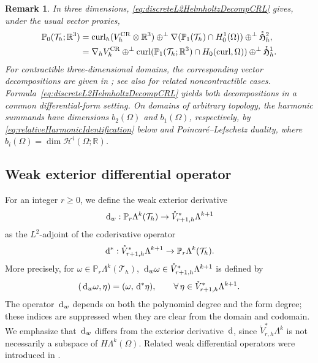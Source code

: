 \documentclass[10pt]{amsart}
\numberwithin{equation}{section}
\newtheorem{remark}[theorem]{Remark}
\newcommand{\dd}{\,{\rm d}}
\newcommand{\curl}{\operatorname{curl}}
\begin{document}
\begin{remark}\rm
In three dimensions, \eqref{eq:discreteL2HelmholtzDecompCRL} gives, under the usual vector proxies,
\begin{align*}
\mathbb P_0(\mathcal T_h;\mathbb R^3)
&=\curl_h(V_h^{\rm CR}\otimes\mathbb R^3)
\oplus^\perp\nabla(\mathbb P_1(\mathcal T_h)\cap H_0^1(\Omega))
\oplus^\perp\mathring{\mathfrak H}_h^2,\\
&=\nabla_hV_h^{\rm CR}
\oplus^\perp\curl(\mathbb P_1(\mathcal T_h;\mathbb R^3)\cap H_0(\curl,\Omega))
\oplus^\perp\mathring{\mathfrak H}_h^1.
\end{align*}
For contractible three-dimensional domains, the corresponding vector
decompositions are given in
\cite[Theorems~4.1 and~4.3]{BringmannKettelerSchedensack2025}; see also
\cite[Remarks~4.4 and~4.5]{BringmannKettelerSchedensack2025} for related
noncontractible cases.
Formula~\eqref{eq:discreteL2HelmholtzDecompCRL} yields both decompositions
in a common differential-form setting. On domains of arbitrary topology,
the harmonic summands have dimensions $b_2(\Omega)$ and $b_1(\Omega)$,
respectively, by \eqref{eq:relativeHarmonicIdentification} below and
Poincar\'e--Lefschetz duality, where
$b_i(\Omega)=\dim \mathscr H^i(\Omega;\mathbb R)$.
\end{remark}

\subsection{Weak exterior differential operator}\label{sec:weakExteriorDerivative}
For an integer $r\geq 0$, we define the weak exterior derivative
\[
\dd_w: \mathbb P_r\Lambda^k(\mathcal T_h)
    \to \mathring{V}_{r+1,h}^{*}\Lambda^{k+1}
\]
as the $L^2$-adjoint of the coderivative operator
\[
\dd^*: \mathring{V}_{r+1,h}^{*}\Lambda^{k+1}
    \to \mathbb P_r\Lambda^k(\mathcal T_h). %
\]
More precisely, for $\omega\in \mathbb P_r\Lambda^k(\mathcal T_h)$,
$\dd_w\omega\in \mathring{V}_{r+1,h}^{*}\Lambda^{k+1}$ is defined by
\begin{equation*}
    (\dd_w\omega,\eta)=(\omega,\dd^*\eta),
    \qquad
    \forall\,\eta\in \mathring{V}_{r+1,h}^{*}\Lambda^{k+1}.
\end{equation*}
The operator $\dd_w$ depends on both the polynomial degree and the form
degree; these indices are suppressed when they are clear from the domain
and codomain.
We emphasize that $\dd_w$ differs from the exterior derivative $\dd$,
since $\mathring{V}_{r,h}^{*}\Lambda^k$ is not necessarily a subspace of
$H\Lambda^k(\Omega)$. Related weak differential operators were introduced in
\cite[Section 2.1]{ChenWuZhongZhou2018}.
\end{document}
